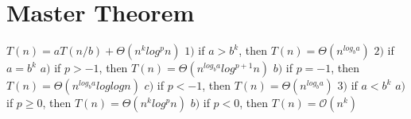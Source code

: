 \documentclass{article}
\begin{document}
\section{Master Theorem}
$T(n) = aT(n/b) + \Theta(n^klog^pn)$  \newline
$1)$ if $ a > b^k $, then $T(n) = \Theta(n^{log_b a})$ \newline
$2)$ if $ a = b^k$ \newline 
\indent $ a) $ if $ p > -1 $, then $T(n) = \Theta(n^{log_b a}log^{p+1}n)$ \newline
\indent $ b) $ if $ p = -1 $, then $T(n) = \Theta(n^{log_b a}loglogn)$ \newline
\indent $ c) $ if $ p < -1 $, then $T(n) = \Theta(n^{log_b a})$ \newline
$3)$ if $ a < b^k $ \newline 
\indent $ a) $ if $ p \geq 0$, then $T(n) = \Theta(n^klog^pn)$ \newline
\indent $ b) $ if $ p < 0 $, then $T(n) = \mathcal{O}(n^k) $
\end{document}
